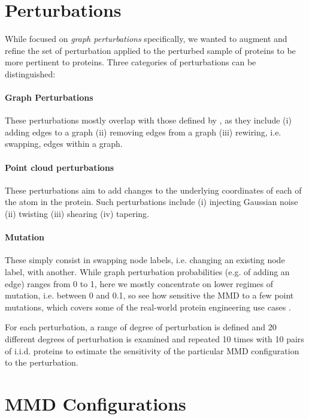 \section{Perturbations}

While \cite{o2021evaluation} focused on \emph{graph perturbations} specifically,
we wanted to augment and refine the set of perturbation applied to the perturbed
sample of proteins to be more pertinent to proteins. Three
categories of perturbations can be distinguished:

\paragraph{Graph Perturbations} These perturbations mostly overlap with those
defined by \cite{o2021evaluation}, as they include (i) adding edges to a graph
(ii) removing edges from a graph (iii) rewiring, i.e. swapping, edges within a
graph.
\paragraph{Point cloud perturbations} These perturbations aim to add changes
to the underlying coordinates of each of the atom in the protein. Such
perturbations include (i) injecting Gaussian noise (ii) twisting (iii) shearing
(iv) tapering.
\paragraph{Mutation} These simply consist in swapping node labels, i.e.
changing an existing node label, with another. While graph perturbation
probabilities (e.g. of adding an edge) ranges from 0 to 1, here we mostly
concentrate on lower regimes of mutation, i.e. between 0 and 0.1, so see how
sensitive the MMD to a few point mutations, which covers some of the
real-world protein engineering use cases \citep{poluri2016protein}.

For each perturbation, a range of degree of perturbation is defined and 20
different degrees of perturbation is examined and repeated 10 times with 10
pairs of i.i.d. proteins to estimate the sensitivity of the particular MMD
configuration to the perturbation.

\section{MMD Configurations}



